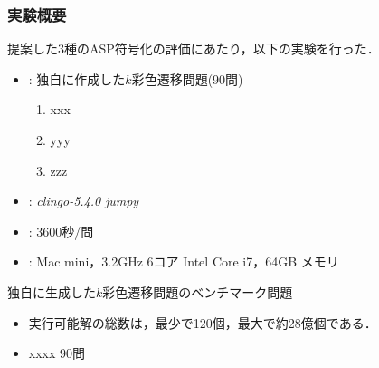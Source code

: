 \documentclass[dvipdfmx,11pt]{beamer}
\begin{document}
\begin{frame}\frametitle{実験概要}
  提案した3種のASP符号化の評価にあたり，以下の実験を行った．
  \bigskip
  \begin{itemize}
    \item {}: 独自に作成した$k$彩色遷移問題(90問)
      \begin{enumerate}
      \item xxx
      \item yyy
      \item zzz
      \end{enumerate}

    \item {}: \textit{clingo-5.4.0} \textit{jumpy}
    \item {}: 3600秒/問
    \item {}: Mac mini，3.2GHz 6コア Intel Core i7，64GB メモリ
  \end{itemize}
  
\end{frame}


\begin{frame}{独自に生成した$k$彩色遷移問題のベンチマーク問題}

  \begin{table}[t]
    \centering
    
  \end{table}

  \begin{itemize}
  \item 実行可能解の総数は，最少で120個，最大で約28億個である．
  \item xxxx 90問
  \end{itemize}

\end{frame}

\end{document}

